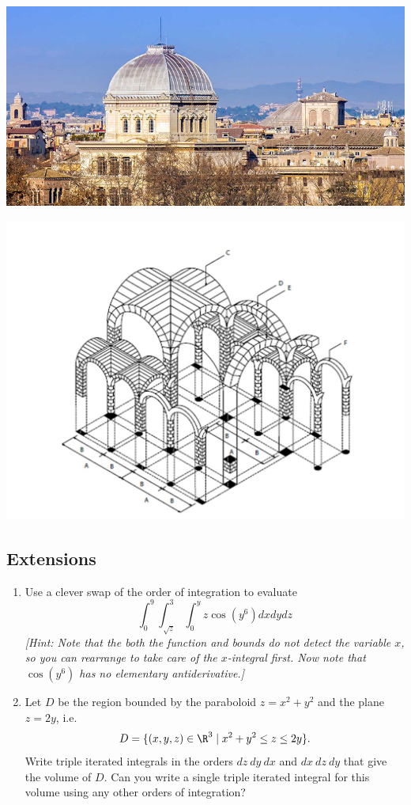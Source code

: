 \begin{enumerate}[resume]
\begin{minipage}{.45\textwidth}
  \centering
  \includegraphics[width=.8\linewidth,alt={synagogue in rome with a Steinmetz shaped dome}]{Jewish-Synagogue-Rome.jpg}
\end{minipage}%
\begin{minipage}{.45\textwidth}
  \centering
  \includegraphics[width=.9\linewidth,alt={architectural diagram of a groined vault ceiling}]{groin vault.jpg}
\end{minipage}
\end{enumerate}
\subsection*{Extensions}
\begin{enumerate}[resume]
	
		
	\item Use a clever swap of the order of integration to evaluate 
    \begin{equation*}
    \int_0^9\int_{\sqrt{z}}^3\int_0^yz\cos(y^6)dxdydz
    \end{equation*}
    \textit{[Hint: Note that the both the function and bounds do not detect the variable $x$, so you can rearrange to take care of the $x$-integral first. Now note that $\cos(y^6)$ has no elementary antiderivative.]}
    
	
	\item Let $D$ be the region bounded by the paraboloid $z=x^2+y^2$ and the 
	plane $z=2y$, i.e. \[D=\{(x,y,z) \in \R^3 \mid x^2+y^2 \leq z \leq 2y\}.\] 
	Write triple iterated integrals in the orders $dz\ dy\ dx$ and  $dx\ dz\ dy$
	that give the volume of $D$.  Can you write a single triple iterated integral for this volume using any other orders of integration?

\end{enumerate}

